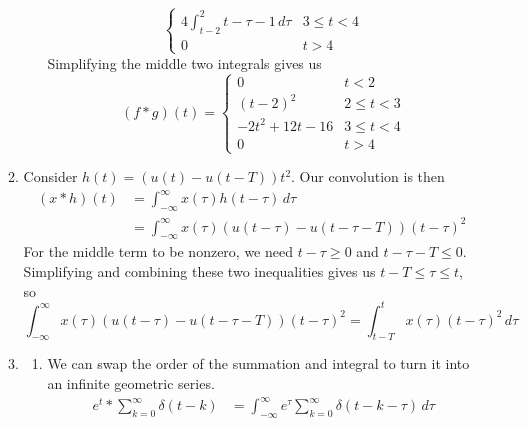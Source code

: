 \documentclass[12pt]{article}
\begin{document}
\begin{enumerate}
\begin{enumerate}
\begin{enumerate}
\[\begin{cases}
                                                4\int_{t-2}^{2} t-\tau-1\,d\tau & 3 \le t < 4 \\
                                                0                               & t > 4
                                          \end{cases}\]
                                    Simplifying the middle two integrals gives us
                                    \[(f * g)(t)=\begin{cases}
                                                0            & t < 2       \\
                                                (t-2)^2      & 2 \le t < 3 \\
                                                -2t^2+12t-16 & 3 \le t < 4 \\
                                                0            & t > 4
                                          \end{cases}\]
                        \end{enumerate}
                  \item Consider $h(t)=(u(t)-u(t-T))t^2$.
                        Our convolution is then
                        \begin{align*}
                              (x * h)(t)
                               & = \int_{-\infty}^{\infty} x(\tau)h(t-\tau)\,d\tau                  \\
                               & = \int_{-\infty}^{\infty} x(\tau)(u(t-\tau)-u(t-\tau-T))(t-\tau)^2
                        \end{align*}
                        For the middle term to be nonzero, we need $t-\tau \ge 0$ and $t-\tau-T \le 0$.
                        Simplifying and combining these two inequalities gives us $t-T \le \tau \le t$, so
                        \[\int_{-\infty}^{\infty} x(\tau)(u(t-\tau)-u(t-\tau-T))(t-\tau)^2
                              =\int_{t-T}^{t} x(\tau)(t-\tau)^2\,d\tau\]
                  \item \begin{enumerate}
                              \item We can swap the order of the summation
                                    and integral to turn it into an infinite geometric series.
                                    \begin{align*}
                                          e^t * \sum_{k=0}^{\infty} \delta(t-k)
                                           & = \int_{-\infty}^{\infty} e^\tau \sum_{k=0}^{\infty} \delta(t-k-\tau)\,d\tau \\

\end{align*}
\end{enumerate}
\end{enumerate}
\end{enumerate}
\end{document}

